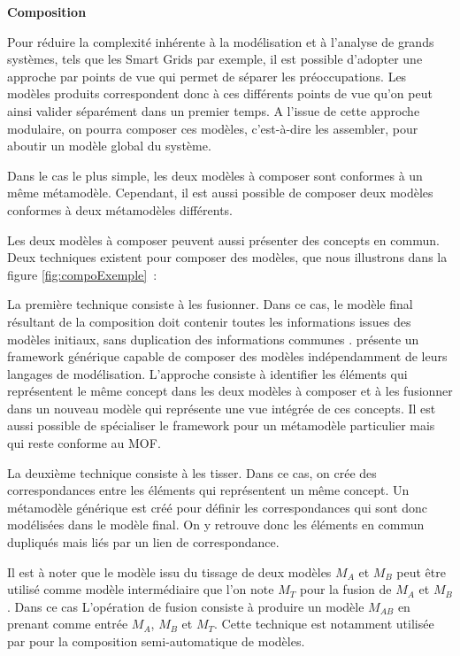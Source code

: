 \begin{description}
\item \textbf{Composition}

Pour réduire la complexité inhérente à la modélisation et à l'analyse de grands systèmes, tels que les Smart Grids par exemple, il est possible d'adopter une approche par points de vue qui permet de séparer les préoccupations. Les modèles produits correspondent donc à ces différents points de vue qu'on peut ainsi valider séparément dans un premier temps. A l'issue de cette approche modulaire, on pourra composer ces modèles, c'est-à-dire les assembler, pour aboutir un modèle global du système.

Dans le cas le plus simple, les deux modèles à composer sont conformes à un même métamodèle. Cependant, il est aussi possible de composer deux modèles conformes à deux métamodèles différents. 

Les deux modèles à composer peuvent aussi présenter des concepts en commun. Deux techniques existent pour composer des modèles, que nous illustrons dans la figure \ref{fig:compoExemple}~:

\begin{bulletList}
\item La première technique consiste à les fusionner. Dans ce cas, le modèle final résultant de la composition doit contenir toutes les informations issues des modèles initiaux, sans duplication des informations communes \cite{bezivin2006canonical}.
\cite{fleurey2008generic} présente un framework générique capable de composer des modèles indépendamment de leurs langages de modélisation. L'approche consiste à identifier les éléments qui représentent le même concept dans les deux modèles à composer et à les fusionner dans un nouveau modèle qui représente une vue intégrée de ces concepts. Il est aussi possible de spécialiser le framework pour un métamodèle particulier mais qui reste conforme au MOF.

\item La deuxième technique consiste à les tisser. Dans ce cas, on crée des correspondances entre les éléments qui représentent un même concept. Un métamodèle générique est créé pour définir les correspondances qui sont donc modélisées dans le modèle final. On y retrouve donc les éléments en commun dupliqués mais liés par un lien de correspondance. 
\end{bulletList}

Il est à noter que le modèle issu du tissage de deux modèles $M_{A}$ et $M_{B}$ peut être utilisé comme modèle intermédiaire que l'on note $M_{T}$ pour la fusion de $M_{A}$ et $M_{B}$. Dans ce cas L'opération de fusion consiste à produire un modèle $M_{AB}$ en prenant comme entrée $M_{A}$, $M_{B}$ et $M_{T}$. Cette technique est notamment utilisée par \cite{del2007semi} pour la composition semi-automatique de modèles.


\end{description}
